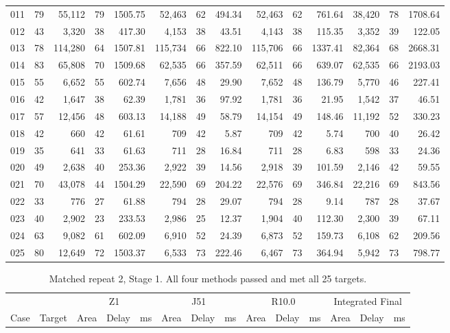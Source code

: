 {\begin{longtable}{@{}lr*{4}{rrr}@{}}
011 & 79 & 55,112 & 79 & 1505.75 & 52,463 & 62 & 494.34 & 52,463 & 62 & 761.64 & 38,420 & 78 & 1708.64 \\
012 & 43 & 3,320 & 38 & 417.30 & 4,153 & 38 & 43.51 & 4,143 & 38 & 115.35 & 3,352 & 39 & 122.05 \\
013 & 78 & 114,280 & 64 & 1507.81 & 115,734 & 66 & 822.10 & 115,706 & 66 & 1337.41 & 82,364 & 68 & 2668.31 \\
014 & 83 & 65,808 & 70 & 1509.68 & 62,535 & 66 & 357.59 & 62,511 & 66 & 639.07 & 62,535 & 66 & 2193.03 \\
015 & 55 & 6,652 & 55 & 602.74 & 7,656 & 48 & 29.90 & 7,652 & 48 & 136.79 & 5,770 & 46 & 227.41 \\
016 & 42 & 1,647 & 38 & 62.39 & 1,781 & 36 & 97.92 & 1,781 & 36 & 21.95 & 1,542 & 37 & 46.51 \\
017 & 57 & 12,456 & 48 & 603.13 & 14,188 & 49 & 58.79 & 14,154 & 49 & 148.46 & 11,192 & 52 & 330.23 \\
018 & 42 & 660 & 42 & 61.61 & 709 & 42 & 5.87 & 709 & 42 & 5.74 & 700 & 40 & 26.42 \\
019 & 35 & 641 & 33 & 61.63 & 711 & 28 & 16.84 & 711 & 28 & 6.83 & 598 & 33 & 24.36 \\
020 & 49 & 2,638 & 40 & 253.36 & 2,922 & 39 & 14.56 & 2,918 & 39 & 101.59 & 2,146 & 42 & 59.55 \\
021 & 70 & 43,078 & 44 & 1504.29 & 22,590 & 69 & 204.22 & 22,576 & 69 & 346.84 & 22,216 & 69 & 843.56 \\
022 & 33 & 776 & 27 & 61.88 & 794 & 28 & 29.07 & 794 & 28 & 9.14 & 787 & 28 & 37.67 \\
023 & 40 & 2,902 & 23 & 233.53 & 2,986 & 25 & 12.37 & 1,904 & 40 & 112.30 & 2,300 & 39 & 67.11 \\
024 & 63 & 9,082 & 61 & 602.09 & 6,910 & 52 & 24.39 & 6,873 & 52 & 159.73 & 6,108 & 62 & 209.56 \\
025 & 80 & 12,649 & 72 & 1503.37 & 6,533 & 73 & 222.46 & 6,467 & 73 & 364.94 & 5,942 & 73 & 798.77 \\
\end{longtable}
\begin{longtable}{@{}lr*{4}{rrr}@{}}
\caption{Matched repeat 2, Stage 1. All four methods passed and met all 25 targets.}\\
\toprule
 & & \multicolumn{3}{c}{Z1} & \multicolumn{3}{c}{J51} & \multicolumn{3}{c}{R10.0} & \multicolumn{3}{c}{Integrated Final} \\
\cmidrule(lr){3-5}\cmidrule(lr){6-8}\cmidrule(lr){9-11}\cmidrule(lr){12-14}
Case & Target & Area & Delay & ms & Area & Delay & ms & Area & Delay & ms & Area & Delay & ms \\

\end{longtable}}
